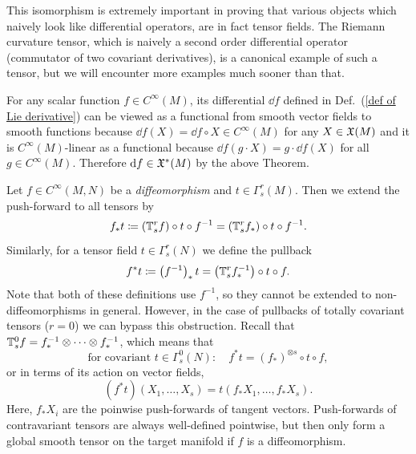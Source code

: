 \begin{rem}
    This isomorphism is extremely important in proving that various objects which naively look like differential operators, are in fact tensor fields. The Riemann curvature tensor, which is naively a second order differential operator (commutator of two covariant derivatives), is a canonical example of such a tensor, but we will encounter more examples much sooner than that.
\end{rem}


\begin{example}\label{df is a one-form}
    For any scalar function $f\in C^\infty(M)$, its differential $\dd f$ defined in Def.\ (\ref{def of Lie derivative}) can be viewed as a functional from smooth vector fields to smooth functions because $\dd f(X)=\dd f\circ X\in C^\infty(M)$ for any $X\in\mathfrak{X}(M)$ and it is $C^\infty(M)$-linear as a functional because $\dd f(g\cdot X)=g\cdot \dd f(X)$ for all $g\in C^\infty(M)$. Therefore ${\mathrm{d}} f\in \mathfrak{X}^\ast(M)$ by the above Theorem.
\end{example}

\begin{defn}
    Let $f\in C^\infty(M,N)$ be a \emph{diffeomorphism} and $t\in \Gamma^r_s(M)$. Then we extend the push-forward to all tensors by
    \[
    f_\ast t\coloneqq (\mathbb{T}^r_sf)\circ t\circ f^{-1}=(\mathbb{T}^r_s f_\ast)\circ t\circ f^{-1}.\label{eq pushforward formula}
    \]
    Similarly, for a tensor field $t\in \Gamma^r_s(N)$ we define the pullback
    \[
    f^\ast t\coloneqq \left(f^{-1}\right)_\ast t=\left(\mathbb{T}^r_s f^{-1}_\ast\right)\circ t\circ f.\label{eq pullback formula}
    \]
    Note that both of these definitions use $f^{-1}$, so they cannot be extended to non-diffeomorphisms in general. However, in the case of pullbacks of totally covariant tensors ($r=0$) we can bypass this obstruction. Recall that $\mathbb{T}^0_s f=f_\ast^{-1}\otimes\cdots\otimes f_\ast^{-1}$, which means that
    \[
    \text{for covariant }t\in \Gamma^0_s(N):\quad f^\ast t= (f_\ast)^{\otimes s}\circ t\circ f,
    \]
    or in terms of its action on vector fields,
    \[
    (f^\ast t)(X_1,\ldots,X_s)=t(f_\ast X_1,\ldots,f_\ast X_s).
    \]
    Here, $f_\ast X_i$ are the poinwise push-forwards of tangent vectors. Push-forwards of contravariant tensors are always well-defined pointwise, but then only form a global smooth tensor on the target manifold if $f$ is a diffeomorphism.
\end{defn}

